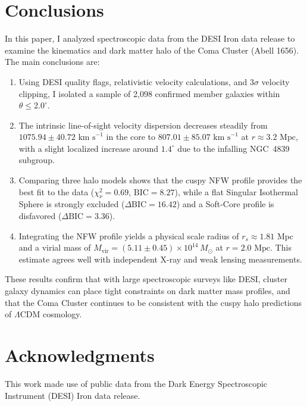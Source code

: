 \documentclass[twocolumn]{aastex631}
\begin{document}
\section{Conclusions} \label{sec:conclusions}

In this paper, I analyzed spectroscopic data from the DESI Iron data release to examine the kinematics and dark matter halo of the Coma Cluster (Abell 1656). The main conclusions are:

\begin{enumerate}
	\item Using DESI quality flags, relativistic velocity calculations, and $3\sigma$ velocity clipping, I isolated a sample of 2,098 confirmed member galaxies within $\theta \le 2.0^\circ$.
	\item The intrinsic line-of-sight velocity dispersion decreases steadily from $1075.94 \pm 40.72\text{ km s}^{-1}$ in the core to $807.01 \pm 85.07\text{ km s}^{-1}$ at $r \approx 3.2\text{ Mpc}$, with a slight localized increase around $1.4^\circ$ due to the infalling NGC~4839 subgroup.
	\item Comparing three halo models shows that the cuspy NFW profile provides the best fit to the data ($\chi_\nu^2 = 0.69$, $\text{BIC} = 8.27$), while a flat Singular Isothermal Sphere is strongly excluded ($\Delta\text{BIC} = 16.42$) and a Soft-Core profile is disfavored ($\Delta\text{BIC} = 3.36$).
	\item Integrating the NFW profile yields a physical scale radius of $r_s \approx 1.81\text{ Mpc}$ and a virial mass of $M_{\text{vir}} = (5.11 \pm 0.45) \times 10^{14}\,M_\odot$ at $r = 2.0\text{ Mpc}$. This estimate agrees well with independent X-ray and weak lensing measurements.
\end{enumerate}

These results confirm that with large spectroscopic surveys like DESI, cluster galaxy dynamics can place tight constraints on dark matter mass profiles, and that the Coma Cluster continues to be consistent with the cuspy halo predictions of $\Lambda\text{CDM}$ cosmology.

\section*{Acknowledgments}
This work made use of public data from the Dark Energy Spectroscopic Instrument (DESI) Iron data release.

\end{document}

